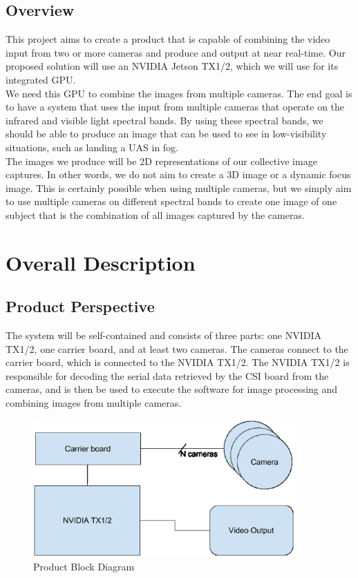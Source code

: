 \documentclass[letterpaper,10pt,serif,draftclsnofoot,onecolumn,compsoc,titlepage]{IEEEtran}
\begin{document}
\subsection{Overview}

This project aims to create a product that is capable of combining the video input from 
two or more cameras and produce and output at near real-time. Our proposed solution 
will use an NVIDIA Jetson TX1/2, which we will use for its integrated GPU.\\

We need this GPU to combine the images from multiple cameras. The end goal is to have 
a system that uses the input from multiple cameras that operate on the infrared and 
visible light spectral bands. By using these spectral bands, we should be able to 
produce an image that can be used to see in low-visibility situations, such as landing 
a UAS in fog.\\

The images we produce will be 2D representations of our collective image captures. In 
other words, we do not aim to create a 3D image or a dynamic focus image. This is 
certainly possible when using multiple cameras, but we simply aim to use multiple 
cameras on different spectral bands to create one image of one subject that is the 
combination of all images captured by the cameras.\\


\section{Overall Description}

\subsection{Product Perspective}

The system will be self-contained and consists of three parts: one NVIDIA TX1/2, 
one carrier board, and at least two cameras. The cameras connect to the carrier board, 
which is connected to the NVIDIA TX1/2. The NVIDIA TX1/2 is responsible for decoding 
the serial data retrieved by the CSI board from the cameras, and is then be used to 
execute the software for image processing and combining images from multiple cameras.\\

\begin{figure}[H]
	\centering
	\label{fig:ProductBlockDiagram}
	\includegraphics[width=10cm]{images/diagram.eps}
	\caption{Product Block Diagram \label{overflow}}
\end{figure}
\end{document}
